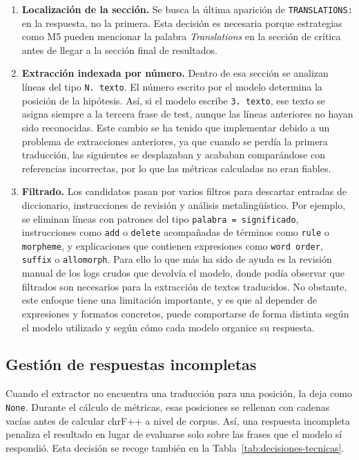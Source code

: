 \begin{enumerate}
	\item \textbf{Localización de la sección.} Se busca la última aparición de \texttt{TRANSLATIONS:} en la respuesta, no la primera. Esta decisión es necesaria porque estrategias como M5 pueden mencionar la palabra \textit{Translations} en la sección de crítica antes de llegar a la sección final de resultados.
	
	\item \textbf{Extracción indexada por número.} Dentro de esa sección se analizan líneas del tipo \texttt{N. texto}. El número escrito por el modelo determina la posición de la hipótesis. Así, si el modelo escribe \texttt{3. texto}, ese texto se asigna siempre a la tercera frase de test, aunque las líneas anteriores no hayan sido reconocidas. Este cambio se ha tenido que implementar debido a un problema de extracciones anteriores, ya que cuando se perdía la primera traducción, las siguientes se desplazaban y acababan comparándose con referencias incorrectas, por lo que las métricas calculadas no eran fiables.
	
	\item \textbf{Filtrado.} Los candidatos pasan por varios filtros para descartar entradas de diccionario, instrucciones de revisión y análisis metalingüístico. Por ejemplo, se eliminan líneas con patrones del tipo \texttt{palabra = significado}, instrucciones como \texttt{add} o \texttt{delete} acompañadas de términos como \texttt{rule} o \texttt{morpheme}, y explicaciones que contienen expresiones como \texttt{word order}, \texttt{suffix} o \texttt{allomorph}. Para ello lo que más ha sido de ayuda es la revisión manual de los logs crudos que devolvía el modelo, donde podía observar que filtrados son necesarios para la extracción de textos traducidos. No obstante, este enfoque tiene una limitación importante, y es que al depender de expresiones y formatos concretos, puede comportarse de forma distinta según el modelo utilizado y según cómo cada modelo organice su respuesta.
\end{enumerate}

\subsection{Gestión de respuestas incompletas}
\label{subsec:respuestas-incompletas}

Cuando el extractor no encuentra una traducción para una posición, la deja como \texttt{None}. Durante el cálculo de métricas, esas posiciones se rellenan con cadenas vacías antes de calcular chrF++ a nivel de corpus. Así, una respuesta incompleta penaliza el resultado en lugar de evaluarse solo sobre las frases que el modelo sí respondió. Esta decisión se recoge también en la Tabla~\ref{tab:decisiones-tecnicas}.


